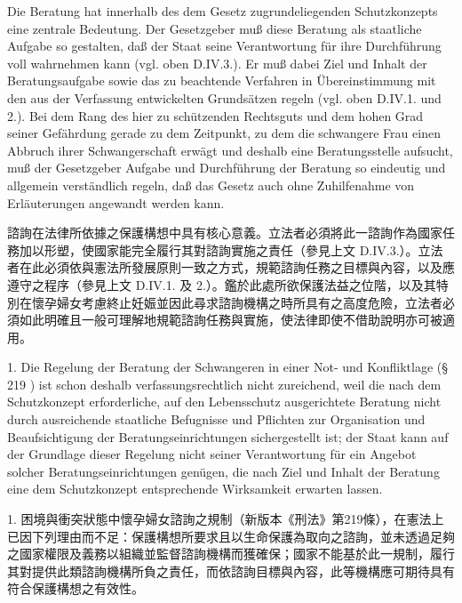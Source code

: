 \documentclass[12pt]{article}
\begin{document}
\begin{sourcepara}[title={原文E.167}]
Die Beratung hat innerhalb des dem Gesetz zugrundeliegenden Schutzkonzepts eine zentrale Bedeutung. Der Gesetzgeber muß diese Beratung als staatliche Aufgabe so gestalten, daß der Staat seine Verantwortung für ihre Durchführung voll wahrnehmen kann (vgl. oben D.IV.3.). Er muß dabei Ziel und Inhalt der Beratungsaufgabe sowie das zu beachtende Verfahren in Übereinstimmung mit den aus der Verfassung entwickelten Grundsätzen regeln (vgl. oben D.IV.1. und 2.). Bei dem Rang des hier zu schützenden Rechtsguts und dem hohen Grad seiner Gefährdung gerade zu dem Zeitpunkt, zu dem die schwangere Frau einen Abbruch ihrer Schwangerschaft erwägt und deshalb eine Beratungsstelle aufsucht, muß der Gesetzgeber Aufgabe und Durchführung der Beratung so eindeutig und allgemein verständlich regeln, daß das Gesetz auch ohne Zuhilfenahme von Erläuterungen angewandt werden kann.
\end{sourcepara}
\begin{transpara}
諮詢在法律所依據之保護構想中具有核心意義。立法者必須將此一諮詢作為國家任務加以形塑，使國家能完全履行其對諮詢實施之責任（參見上文 D.IV.3.）。立法者在此必須依與憲法所發展原則一致之方式，規範諮詢任務之目標與內容，以及應遵守之程序（參見上文 D.IV.1. 及 2.）。鑑於此處所欲保護法益之位階，以及其特別在懷孕婦女考慮終止妊娠並因此尋求諮詢機構之時所具有之高度危險，立法者必須如此明確且一般可理解地規範諮詢任務與實施，使法律即使不借助說明亦可被適用。
\end{transpara}

\begin{sourcepara}[title={原文E.168}]
1. Die Regelung der Beratung der Schwangeren in einer Not- und Konfliktlage (§ 219 \abbrStGB{} \abbrNF{}) ist schon deshalb verfassungsrechtlich nicht zureichend, weil die nach dem Schutzkonzept erforderliche, auf den Lebensschutz ausgerichtete Beratung nicht durch ausreichende staatliche Befugnisse und Pflichten zur Organisation und Beaufsichtigung der Beratungseinrichtungen sichergestellt ist; der Staat kann auf der Grundlage dieser Regelung nicht seiner Verantwortung für ein Angebot solcher Beratungseinrichtungen genügen, die nach Ziel und Inhalt der Beratung eine dem Schutzkonzept entsprechende Wirksamkeit erwarten lassen.
\end{sourcepara}
\begin{transpara}
1. 困境與衝突狀態中懷孕婦女諮詢之規制（新版本《刑法》第219條），在憲法上已因下列理由而不足：保護構想所要求且以生命保護為取向之諮詢，並未透過足夠之國家權限及義務以組織並監督諮詢機構而獲確保；國家不能基於此一規制，履行其對提供此類諮詢機構所負之責任，而依諮詢目標與內容，此等機構應可期待具有符合保護構想之有效性。
\end{transpara}
\end{document}
